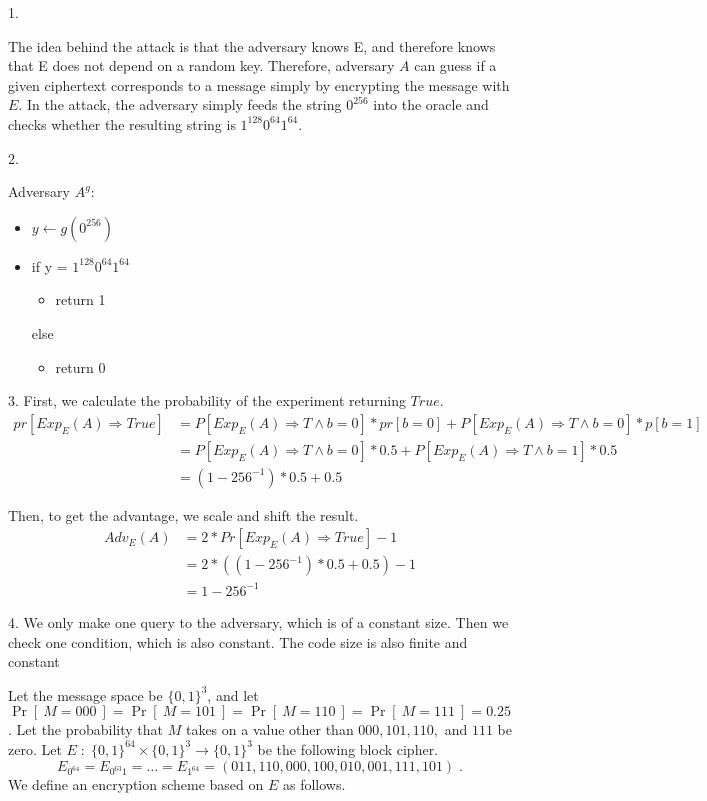 \documentclass{exam}
\newcommand{\Colon}{\;:\;}
\newcommand{\Prob}[1]{\Pr\left[\: #1 \:\right]}
\newcommand{\bits}{\{0,1\}}
\begin{document}
\begin{questions}
\begin{parts}
    1.

    The idea behind the attack is that the adversary knows E, and therefore knows that E does not depend on a random key. Therefore, adversary $A$ can guess if a given ciphertext corresponds to a message simply by encrypting the message with $E$. In the attack, the adversary simply feeds the string $0^{256}$ into the oracle and checks whether the resulting string is $1^{128}0^{64}1^{64}$.

    2.

    Adversary $A^g$:\\
    \begin{itemize}
      \item[] $y\leftarrow g(0^{256}) $\\
      \item[] if y = $1^{128}0^{64}1^{64}$\\
      \begin{itemize}
        \item[] return 1
      \end{itemize}
      else
      \begin{itemize}
        \item[] return 0
      \end{itemize}
    \end{itemize}


  3.
  First, we calculate the probability of the experiment returning $True$.
 \begin{align*}
  pr[Exp_E(A) \Rightarrow True] &= P[Exp_E(A) \Rightarrow T \wedge b = 0] * pr[b=0] + P[Exp_E(A) \Rightarrow T \wedge b = 0] * p[b=1]\\
   &= P[Exp_E(A) \Rightarrow T \wedge b = 0] * 0.5 + P[Exp_E(A) \Rightarrow T \wedge b = 1] * 0.5\\
   &= (1-256^{-1}) * 0.5 + 0.5
\end{align*}

  Then, to get the advantage, we scale and shift the result.
\begin{align*}
  Adv_E(A) &= 2 * Pr[Exp_E(A) \Rightarrow True] - 1 \\
  &= 2 * ((1-256^{-1}) * 0.5 + 0.5) - 1\\
   &= 1-256^{-1}
\end{align*}

4. We only make one query to the adversary, which is of a constant size. Then we check one condition, which is also constant. The code size is also finite and constant

\end{parts}
  \bigskip
  \question  Let the message space be $\bits^{3}$, and let $\Prob{M=000} = \Prob{M=101} = \Prob{M=110} = \Prob{M=111} = 0.25$.  Let the probability that $M$ takes on a value other than $000, 101, 110,$ and $111$ be zero. Let $E \Colon \bits^{64} \times \bits^3 \rightarrow \bits^3$ be the following block cipher.
  \[ E_{0^{64}} = E_{0^{63}1} = \ldots = E_{1^{64}} = (011, 110, 000, 100, 010, 001, 111, 101) \;.\]
  We define an encryption scheme based on $E$ as follows.
  \medskip


\end{questions}
\end{document}

